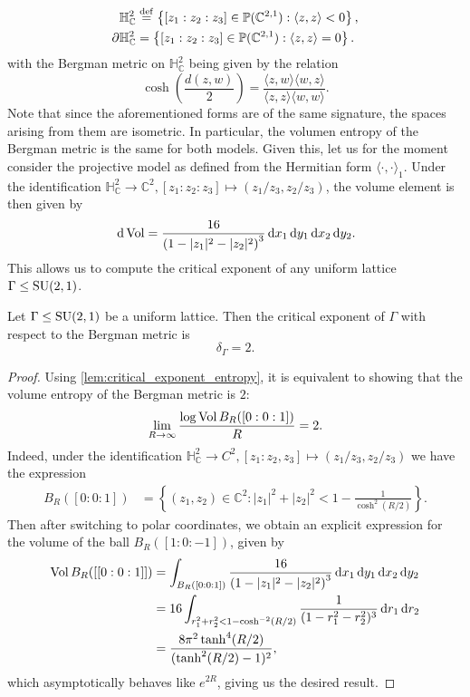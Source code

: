 \documentclass{report}
\begin{document}
\begin{align*}
    \mathbb H^2_{\mathbb C} &\overset{\mathrm{def}}{=} \left\{ [z_1: z_2: z_3] \in \mathbb P(\mathbb C^{2,1}): \langle z, z \rangle < 0 \right\},\\
    \partial \mathbb H^2_{\mathbb C} &= \left\{ [z_1: z_2: z_3] \in \mathbb P(\mathbb C^{2,1}): \langle z, z \rangle = 0 \right\}.
\end{align*}
with the Bergman metric on $\mathbb H^2_{\mathbb C}$ being given by the relation
\[
\cosh\left(\frac{d(z,w)}{2}\right) = \frac{\langle z, w \rangle \langle w, z \rangle}{\langle z, z \rangle \langle w, w \rangle}.
\]
Note that since the aforementioned forms are of the same signature, the spaces arising from them are isometric.
In particular, the volumen entropy of the Bergman metric is the same for both models.
Given this, let us for the moment consider the projective model as defined from the Hermitian form $\langle \cdot, \cdot \rangle_1$.
Under the identification $\mathbb H^2_{\mathbb C} \to \mathbb C^2, [z_1:z_2:z_3] \mapsto (z_1/z_3, z_2/z_3)$, the volume element is then given by
\[
\,\mathrm{d} \operatorname{Vol} = \frac{16}{\left(1 - |z_1|^2 - |z_2|^2\right)^3} \,\mathrm{d} x_1 \,\mathrm{d} y_1 \,\mathrm{d} x_2 \,\mathrm{d} y_2 .
\]
This allows us to compute the critical exponent of any uniform lattice $\Gamma \leq \operatorname{{\mathrm{SU}}}(2,1)$.
\begin{lemma}
    Let $\Gamma \leq \operatorname{{\mathrm{SU}}}(2,1)$ be a uniform lattice.
    Then the critical exponent of $\Gamma$ with respect to the Bergman metric is
    \[
    \delta_\Gamma = 2.
    \]
\end{lemma}
\begin{proof}
    Using \cref{lem:critical_exponent_entropy}, it is equivalent to showing that the volume entropy of the Bergman metric is $2$:
    \[
    \lim_{R \to \infty} \frac{\log \operatorname{Vol} B_R([0:0:1])}{R}  = 2.
    \]
    Indeed, under the identification $\mathbb H^2_{\mathbb C} \to C^2, [z_1:z_2,z_3] \mapsto (z_1/z_3, z_2/z_3)$ we have the expression
    \begin{align*}
        B_R([0:0:1]) &= \left\{ 
        (z_1, z_2) \in \mathbb C^2 : |z_1|^2 + |z_2|^2 < 1 - \frac{1}{\cosh^2(R/2)}
    \right\}.
    \end{align*}
    Then after switching to polar coordinates, we obtain an explicit expression for the volume of the ball $B_R([1:0:-1])$, given by
    \begin{align*}
        \operatorname{Vol} B_R([[0:0:1]]) &= \int_{B_R([0:0:1])} \frac{16}{\left(1 - |z_1|^2 - |z_2|^2\right)^3} \,\mathrm{d} x_1 \,\mathrm{d} y_1 \,\mathrm{d} x_2 \,\mathrm{d} y_2\\
        &= 16 \int_{r_1^2 + r_2^2 < 1 - \cosh^{-2}(R/2)} \frac{1}{(1 - r_1^2 - r_2^2)^3} \,\mathrm{d} r_1 \,\mathrm{d} r_2\\
        &= \frac{8 \pi^2 \tanh^4(R/2)}{(\tanh^2(R/2) - 1)^2},
    \end{align*}
which asymptotically behaves like $e^{2R}$, giving us the desired result.
\end{proof}
\end{document}
